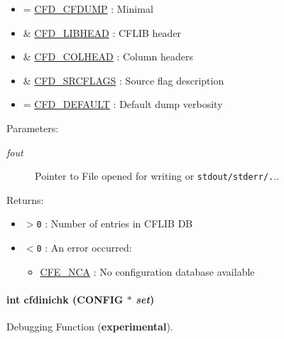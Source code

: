 \begin{itemize}
\item = \hyperlink{group__advanced__features_gb28b8410738c00c62003a5f5b2b19827}{CFD\_\-CFDUMP} : Minimal \item \& \hyperlink{group__advanced__features_g6a97e565629fc3e7423e4feb804eb5d0}{CFD\_\-LIBHEAD} : CFLIB header \item \& \hyperlink{group__advanced__features_g05403834c7c6377bcf762d640c0d0854}{CFD\_\-COLHEAD} : Column headers \item \& \hyperlink{group__advanced__features_g9deeb100c2dc701f8f8193b8fb53fbff}{CFD\_\-SRCFLAGS} : Source flag description \item = \hyperlink{group__advanced__features_g61cced010b3d926e37aafdf615951875}{CFD\_\-DEFAULT} : Default dump verbosity\end{itemize}
\begin{Desc}
\item[Parameters:]
\begin{description}
\item[{\em fout}]Pointer to File opened for writing or {\tt stdout/{\tt stderr/}.}..\end{description}
\end{Desc}
\begin{Desc}
\item[Returns:]\begin{itemize}
\item {\tt $>$0} : Number of entries in CFLIB DB \item {\tt $<$0} : An error occurred:\begin{itemize}
\item \hyperlink{group__errors_gf8cd36471ddcc549668f49238855609d}{CFE\_\-NCA} : No configuration database available \end{itemize}
\end{itemize}
\end{Desc}
\hypertarget{group__advanced__features_g35e2c28f591ac71e3617c612233ecdd0}{
\paragraph[{cfdinichk}]{\setlength{\rightskip}{0pt plus 5cm}int cfdinichk ({\bf CONFIG} $\ast$ {\em set})}\hfill}
\label{group__advanced__features_g35e2c28f591ac71e3617c612233ecdd0}


Debugging Function ({\bf experimental}). 

